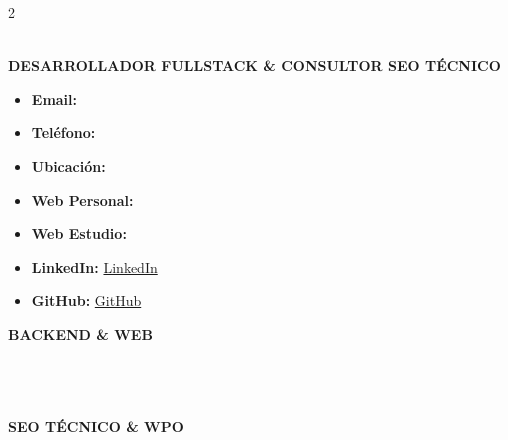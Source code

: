 \documentclass[10pt,a4paper]{article}
\begin{document}
\begin{paracol}{2}

\begin{center}
  
  \vspace{1.0em}
  {\color{primary}\LARGE\bfseries \myname} \\[0.2em]
  {\color{accent}\small\bfseries DESARROLLADOR FULLSTACK \& CONSULTOR SEO TÉCNICO}
\end{center}

\small
\begin{itemize}[label={}, leftmargin=0.2cm]
  \item \textbf{\color{accent}Email:} \href{mailto:\myemail}{\myemail}
  \item \textbf{\color{accent}Teléfono:} \href{tel:\myphone}{\myphone}
  \item \textbf{\color{accent}Ubicación:} \mylocation
  \item \textbf{\color{accent}Web Personal:} \href{https://\myweb}{\myweb}
  \item \textbf{\color{accent}Web Estudio:} \href{https://\mywebwalkiria}{\mywebwalkiria}
  \item \textbf{\color{accent}LinkedIn:} \href{https://\mylinkedin}{LinkedIn}
  \item \textbf{\color{accent}GitHub:} \href{https://\mygithub}{GitHub}
\end{itemize}

\textbf{\color{primary}\footnotesize BACKEND \& WEB} \\
   \\
   \\
   \\

\vspace{0.4em}
\textbf{\color{primary}\footnotesize SEO TÉCNICO \& WPO} \\
  \\
  \\
  \\
 


\end{paracol}
\end{document}
